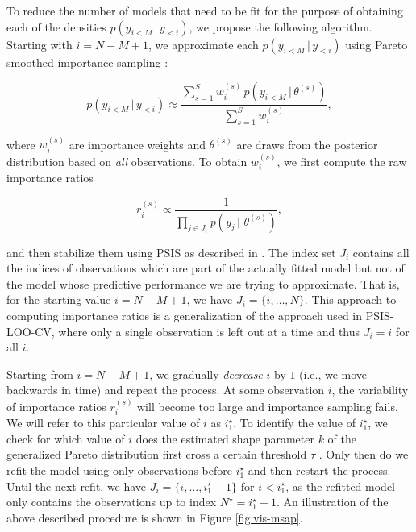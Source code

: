 \documentclass[american,]{article}
\begin{document}
To reduce the number of models that need to be fit for the purpose of obtaining
each of the densities \(p(y_{i<M} \,|\, y_{<i})\), we propose the following
algorithm. Starting with \(i = N - M + 1\), we approximate each
\(p(y_{i<M} \,|\, y_{<i})\) using Pareto smoothed importance sampling \citep[PSIS;][]{vehtari2017loo, vehtari2017psis}:

\begin{equation}
 p(y_{i<M} \,|\, y_{<i}) \approx
   \frac{ \sum_{s=1}^S w_i^{(s)}\, p(y_{i<M} \,|\, \theta^{(s)})}{ \sum_{s=1}^S w_i^{(s)}},
\end{equation}

where \(w_i^{(s)}\) are importance weights and \(\theta^{(s)}\) are draws from the
posterior distribution based on \emph{all} observations. To obtain \(w_i^{(s)}\), we
first compute the raw importance ratios

\begin{equation}
r_i^{(s)} \propto \frac{1}{\prod_{j \in J_i} p(y_j \,|\, \,\theta^{(s)})},
\end{equation}

and then stabilize them using PSIS as described in \citet{vehtari2017psis}. The index
set \(J_i\) contains all the indices of observations which are part of the actually
fitted model but not of the model whose predictive performance we are trying to
approximate. That is, for the starting value \(i = N - M + 1\), we have
\(J_i = \{i, \ldots, N\}\). This approach to computing importance ratios is a
generalization of the approach used in PSIS-LOO-CV, where only a single observation
is left out at a time and thus \(J_i = i\) for all \(i\).

Starting from \(i = N - M + 1\), we gradually \emph{decrease} \(i\) by \(1\) (i.e., we move
backwards in time) and repeat the process. At some observation \(i\), the
variability of importance ratios \(r_i^{(s)}\) will become too large and
importance sampling fails. We will refer to this particular value of \(i\) as
\(i^\star_1\). To identify the value of \(i^\star_1\), we check for which value of
\(i\) does the estimated shape parameter \(k\) of the generalized Pareto
distribution first cross a certain threshold \(\tau\) \citep{vehtari2017psis}. Only
then do we refit the model using only observations before \(i^\star_1\) and then
restart the process. Until the next refit, we have \(J_i = \{i, \ldots, i^\star_1 -1 \}\) for \(i < i^\star_1\), as the refitted model only contains the observations
up to index \(N^\star_1 = i^\star_1 - 1\). An illustration of the above described procedure is shown in Figure \ref{fig:vis-msap}.
\end{document}
